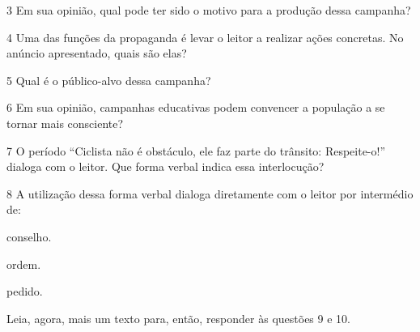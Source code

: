 \num{3} Em sua opinião, qual pode ter sido o motivo para a produção dessa campanha?


\num{4} Uma das funções da propaganda é levar o leitor a realizar ações
concretas. No anúncio apresentado, quais são elas?


\num{5} Qual é o público-alvo dessa campanha?


\num{6} Em sua opinião, campanhas educativas podem convencer a população a se
tornar mais consciente?


\num{7} O período ``Ciclista não é obstáculo, ele faz parte do trânsito:
Respeite-o!'' dialoga com o leitor. Que forma verbal indica essa
interlocução?



\num{8} A utilização dessa forma verbal dialoga diretamente com o leitor por
intermédio de:

\begin{boxlist}
 conselho.

 ordem.

 pedido.
\end{boxlist}

Leia, agora, mais um texto para, então, responder às questões 9 e 10.


